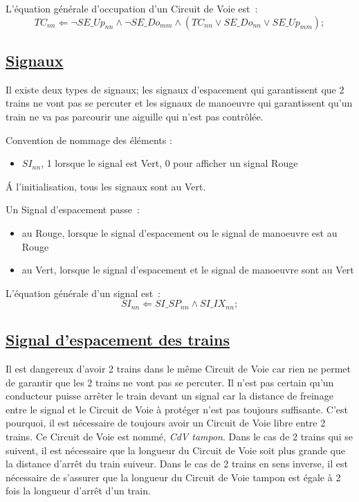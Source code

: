 \medskip
L'équation générale d'occupation d'un Circuit de Voie est~:
$$\boxed{
  TC_{nn} \Leftarrow \neg SE\_Up_{nn} \land \neg SE\_Do_{mm} \land
  (TC_{nn} \lor SE\_Do_{nn} \lor SE\_Up_{mm});
}$$


\subsection{\underline{Signaux}}
\label{sec:esp}

Il existe deux types de signaux; les signaux d'espacement qui
garantissent que 2 trains ne vont pas se percuter et les signaux de
manoeuvre qui garantissent qu'un train ne va pas parcourir une
aiguille qui n'est pas contrôlée.

Convention de nommage des éléments :
\begin{itemize}
\item $SI_{nn}$, 1 lorsque le signal est Vert, 0 pour afficher un signal
  Rouge
\end{itemize}

\'A l'initialisation, tous les signaux sont au Vert.

Un Signal d'espacement passe~:
\begin{itemize}
\item au Rouge, lorsque le signal d'espacement ou le signal de
  manoeuvre est au Rouge
\item au Vert, lorsque le signal d'espacement et le signal de
  manoeuvre sont au Vert
\end{itemize}


\medskip
L'équation générale d'un signal est~:
$$\boxed{
  SI_{nn} \Leftarrow SI\_SP_{nn} \land SI\_IX_{nn};
}$$


\subsection{\underline{Signal d'espacement des trains}}
\label{sec:esp}

Il est dangereux d'avoir 2 trains dans le même Circuit de Voie car
rien ne permet de garantir que les 2 trains ne vont pas se
percuter. Il n'est pas certain qu'un conducteur puisse arrêter le
train devant un signal car la distance de freinage entre le signal et
le Circuit de Voie à protéger n'est pas toujours suffisante. C'est
pourquoi, il est nécessaire de toujours avoir un Circuit de Voie libre
entre 2 trains. Ce Circuit de Voie est nommé, \emph{CdV tampon}.  Dans
le cas de 2 trains qui se suivent, il est nécessaire que la longueur
du Circuit de Voie soit plus grande que la distance d'arrêt du train
suiveur.  Dans le cas de 2 trains en sens inverse, il est nécessaire
de s'assurer que la longueur du Circuit de Voie tampon est égale à 2
fois la longueur d'arrêt d'un train.

